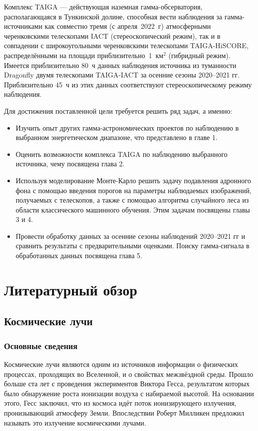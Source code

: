 \documentclass[magd,floatypics,numeref]{msudipl} %
\begin{document}
Комплекс TAIGA --- действующая наземная гамма-обсерватория, располагающаяся в Тункинской долине, способная вести наблюдения за гамма-источниками как совместно тремя (с апреля~2022~г) атмосферными черенковскими телескопами IACT (стереоскопический режим), так и в совпадении с широкоугольными черенковскими телескопами TAIGA-HiSCORE, распределёнными на площади приблизительно~1~$\text{км}^{\text{2}}$ (гибридный режим).
Имеется приблизительно 80~ч данных наблюдения источника из туманности Dragonfly двумя телескопами TAIGA-IACT за осенние сезоны 2020--2021 гг. Приблизительно 45~ч из этих данных соответствуют стереоскопическому режиму наблюдения.

Для достижения поставленной цели требуется решить ряд задач, а именно:
\begin{itemize}
\item Изучить опыт других гамма-астрономических проектов по наблюдению в выбранном энергетическом диапазоне, что представлено в главе 1. 
\item Оценить возможности комплекса TAIGA  по наблюдению выбранного источника, чему посвящена глава 2. 
\item Используя моделирование Монте-Карло решить задачу подавления адронного фона с помощью введения порогов на параметры наблюдаемых изображений, получаемых с телескопов, а также с помощью алгоритма случайного леса из области классического машинного обучения. Этим задачам посвящены главы 3 и 4.
\item Провести обработку данных за осенние сезоны наблюдений 2020--2021 гг и сравнить результаты с предварительными оценками. Поиску гамма-сигнала в обработанных данных посвящена глава 5. 
\end{itemize}


\chapter{Литературный обзор}
\section{Космические лучи}
\subsection{Основные сведения}
Космические лучи являются одним из источников информации о физических процессах, проходящих во Вселенной, и о свойствах межзвёздной среды. Прошло больше ста лет с проведения экспериментов Виктора Гесса, результатом которых было обнаружение роста ионизации воздуха с набираемой высотой. На основании этого, Гесс заключил, что из космоса идёт поток ионизирующего излучения, пронизывающий атмосферу Земли. Впоследствии Роберт Милликен предложил называть это излучение космическими лучами.
\end{document}

